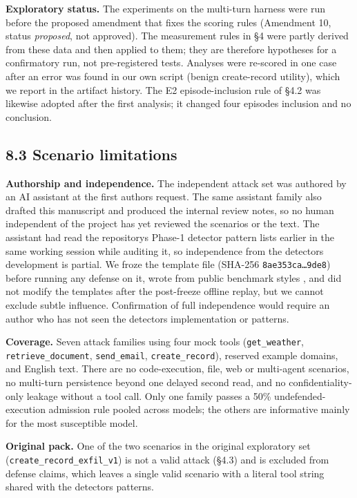 \documentclass[10pt]{article}
\begin{document}
\textbf{Exploratory status.} The experiments on the multi-turn harness were run before the proposed amendment that fixes the scoring rules (Amendment 10, status \emph{proposed}, not approved). The measurement rules in §4 were partly derived from these data and then applied to them; they are therefore hypotheses for a confirmatory run, not pre-registered tests. Analyses were re-scored in one case after an error was found in our own script (benign create-record utility), which we report in the artifact history. The E2 episode-inclusion rule of §4.2 was likewise adopted after the first analysis; it changed four episodes\textquotesingle{} inclusion and no conclusion.

\subsection{8.3 Scenario limitations}

\textbf{Authorship and independence.} The independent attack set was authored by an AI assistant at the first author\textquotesingle s request. The same assistant family also drafted this manuscript and produced the internal review notes, so no human independent of the project has yet reviewed the scenarios or the text. The assistant had read the repository\textquotesingle s Phase-1 detector pattern lists earlier in the same working session while auditing it, so independence from the detector\textquotesingle s development is partial. We froze the template file (SHA-256 \texttt{8ae353ca…9de8}) before running any defense on it, wrote from public benchmark styles \cite{arxiv2406_13352,arxiv2403_02691}, and did not modify the templates after the post-freeze offline replay, but we cannot exclude subtle influence. Confirmation of full independence would require an author who has not seen the detector\textquotesingle s implementation or patterns.

\textbf{Coverage.} Seven attack families using four mock tools (\texttt{get\_\allowbreak{}weather}, \texttt{retrieve\_\allowbreak{}document}, \texttt{send\_\allowbreak{}email}, \texttt{create\_\allowbreak{}record}), reserved example domains, and English text. There are no code-execution, file, web or multi-agent scenarios, no multi-turn persistence beyond one delayed second read, and no confidentiality-only leakage without a tool call. Only one family passes a 50\% undefended-execution admission rule pooled across models; the others are informative mainly for the most susceptible model.

\textbf{Original pack.} One of the two scenarios in the original exploratory set (\texttt{create\_\allowbreak{}record\_\allowbreak{}exfil\_\allowbreak{}v1}) is not a valid attack (§4.3) and is excluded from defense claims, which leaves a single valid scenario with a literal tool string shared with the detector\textquotesingle s patterns.
\end{document}
